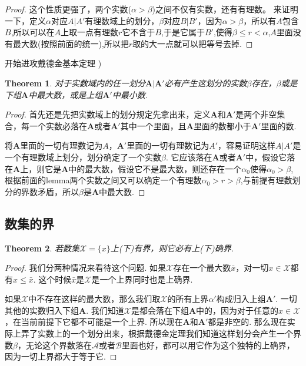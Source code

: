 \documentclass{article}
\newtheorem{theorem}{Theorem}[section]
\begin{document}
\begin{proof}
这个性质更强了，两个实数($\alpha > \beta$)之间不仅有实数，还有有理数。 来证明一下，定义$\alpha$对应$A|A'$有理数域上的划分，$\beta$对应$B|B'$，因为$\alpha > \beta$，所以有$A$包含$B$,所以可以在$A$上取一点有理数$r$它不含于$B$,于是它属于$B'$,使得$\beta \leq r<\alpha$,$A$里面没有最大数(按照前面的统一),所以把$r$取的大一点就可以把等号去掉.
\end{proof}

开始进攻{\color{red}戴德金基本定理} )

\begin{theorem}
对于实数域内的任一划分$\textbf{A}| \textbf{A}'$必有产生这划分的实数$\beta$存在，$\beta$或是下组$\textbf{A}$中最大数，或是上组$\textbf{A}'$中最小数.	
\end{theorem}

\begin{proof}
首先还是先把实数域上的划分规定先拿出来，定义$\textbf{A}$和$\textbf{A}'$是两个非空集合，每一个实数必落在$\textbf{A}$或者$\textbf{A}'$其中一个里面，且$\textbf{A}$里面的数都小于$\textbf{A}'$里面的数.

将$\textbf{A}$里面的一切有理数记为$A$，$\textbf{A}'$里面的一切有理数记为$A'$，容易证明这样$A|A'$是一个有理数域上划分，划分确定了一个实数$\beta$. 它应该落在$\textbf{A}$或者$\textbf{A}'$中，假设它落在$\textbf{A}$上，则它是$\textbf{A}$中的最大数，假设它不是最大数，则还存在一个$\alpha_0$使得$\alpha_0 > \beta$,根据前面的lemma两个实数之间又可以确定一个有理数$\alpha_0 > r > \beta$,与前提有理数划分的界数矛盾，所以$\beta$是$\textbf{A}$中最大数.
\end{proof}

\newpage
\subsection{数集的界}

\begin{theorem}
若数集$\mathcal{X}=\{x\}$上(下)有界，则它必有上(下)确界.
\end{theorem}

\begin{proof}
我们分两种情况来看待这个问题.
如果$\mathcal{X}$存在一个最大数$\bar{x}$，对一切$x \in \mathcal{X}$都有$x \leq \bar{x}$. 这个时候$\bar{x}$是$\mathcal{X}$是一个上界同时也是上确界.

如果$\mathcal{X}$中不存在这样的最大数，那么我们取$\mathcal{X}$的所有上界$\alpha'$构成归入上组$\textbf{A}'$. 一切其他的实数归入下组$\textbf{A}$. 我们知道$\mathcal{X}$是都会落在下组$\textbf{A}$中的，因为对于任意的$x \in \mathcal{X}$，在当前前提下它都不可能是一个上界. 所以现在$\textbf{A}$和$\textbf{A}'$都是非空的. 那么现在实际上弄了实数上的一个划分出来，根据戴德金定理我们知道这样划分会产生一个界数$\beta$，无论这个界数落在$\mathcal{A}$或者$\mathcal{B}$里面也好，都可以用它作为这个独特的上确界，因为一切上界都大于等于它. 
\end{proof}
\end{document}
